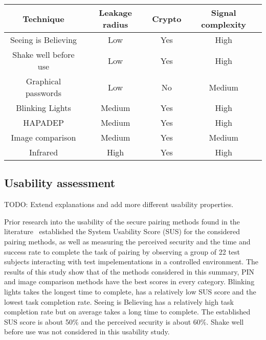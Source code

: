 \documentclass[conference, 12pt]{sty/IEEEtran}
\begin{document}
\hspace{-3em}
\begin{footnotesize}
\begin{tabular}{c|c|c|c}
	Technique & Leakage radius & Crypto & Signal complexity \\
	\hline
	  Seeing is Believing & Low & Yes & High \\
	Shake well before use & Low & Yes & High \\
    	  Graphical passwords & Low & No & Medium \\
  Blinking Lights & Medium & Yes & High \\
	 HAPADEP & Medium & Yes & High \\
	Image comparison & Medium & Yes & Medium\\
	Infrared & High & Yes & High \\
\end{tabular}
\end{footnotesize}
\hspace{3em}


\subsection{Usability assessment}
\label{ssec:usability_assessment}

TODO: Extend explanations and add more different usability properties.

Prior research into the usability of the secure pairing methods found in the literature~\cite{kumar2009comparative} established the System Usability Score (SUS) for the considered pairing methods, as well as measuring the perceived security and the time and success rate to complete the task of pairing by observing a group of 22 test subjects interacting with test impelementations in a controlled environment.
The results of this study show that of the methods considered in this summary, PIN and image comparison methods have the best scores in every category.
Blinking lights takes the longest time to complete, has a relatively low SUS score and the lowest task completion rate.
Seeing is Believing has a relatively high task completion rate but on average takes a long time to complete.
The established SUS score is about 50\% and the perceived security is about 60\%.
Shake well before use was not considered in this usability study.
\end{document}
